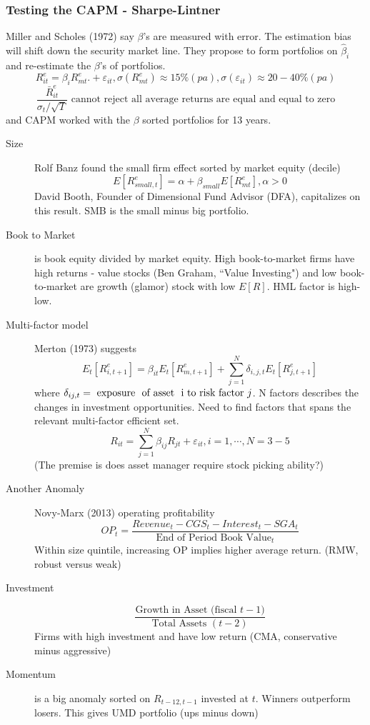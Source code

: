 \documentclass[11pt, a4paper, oneside]{article}
\theoremstyle{definition}
\theoremstyle{proposition}
\theoremstyle{corollary}
\theoremstyle{lemma}
\theoremstyle{theorem}
\begin{document}
\subsubsection{Testing the CAPM - Sharpe-Lintner}
Miller and Scholes (1972) say $\beta$'s are measured with error. The estimation bias will shift down the security market line. They propose to form portfolios on $\hat{\beta}_i$ and re-estimate the $\beta$'s of portfolios. 
$$R_{it}^e = \beta_i R_{mt}^e. + \varepsilon_{it}, \sigma(R_{mt}^e) \approx 15\% (pa), \sigma(\varepsilon_{it} ) \approx 20-40\% (pa)$$
$$\frac{\bar{R}_{it}^e}{\sigma_t/\sqrt{T}}\text{ cannot reject all average returns are equal and equal to zero}$$
and CAPM worked with the $\beta$ sorted portfolios for 13 years. 
\begin{description}
\item[Size] Rolf Banz found the small firm effect sorted by market equity (decile)
$$E[R^e_{small, t}] = \alpha + \beta_{small}E[R_{mt}^e], \alpha > 0$$ 
David Booth, Founder of Dimensional Fund Advisor (DFA), capitalizes on this result. SMB is the small minus big portfolio. 
\item[Book to Market] is book equity divided by market equity. High book-to-market firms have high returns - value stocks (Ben Graham, ``Value Investing") and low book-to-market are growth (glamor) stock with low $E[R]$. HML factor is high-low. 
\item[Multi-factor model] Merton (1973) suggests
$$E_t[R^e_{i, t+1}] = \beta_{it} E_t[R_{m, t+1}^e] + \sum_{j=1}^N \delta_{i, j, t} E_t[R_{j, t+1}^e]$$
where $\delta_{ij, t} = \text{ exposure  \text{ of asset } i to risk factor } j$. N factors describes the changes in investment opportunities. Need to find factors that spans the relevant multi-factor efficient set. 
$$R_{it} = \sum_{j=1}^N \beta_{ij}R_{jt} + \varepsilon_{it}, i=1, \cdots, N = 3 - 5$$
(The premise is does asset manager require stock picking ability?)
\item[Another Anomaly] Novy-Marx (2013) operating profitability
$$OP_t = \frac{Revenue_t - CGS_t - Interest_t - SGA_t}{\text{End of Period Book Value}_t}$$
Within size quintile, increasing OP implies higher average return. (RMW, robust versus weak)
\item[Investment] $$\frac{\text{Growth in Asset (fiscal }t - 1)}{\text{Total Assets }(t-2)}$$ 
Firms with high investment and have low return (CMA, conservative minus aggressive)
\item[Momentum] is a big anomaly sorted on $R_{t-12, t-1}$ invested at $t$. Winners outperform losers. This gives UMD portfolio (ups minus down)

\end{description}
\end{document}
